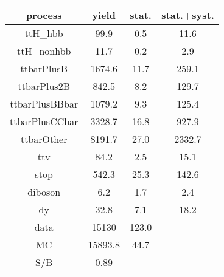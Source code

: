 \begin{tabular}{cccc}
\hline
    process     &  yield  &  stat.  &  stat.+syst.  \\
\hline
    ttH\_hbb     &  99.9   &   0.5   &     11.6      \\
   ttH\_nonhbb   &  11.7   &   0.2   &      2.9      \\
   ttbarPlusB   & 1674.6  &  11.7   &     259.1     \\
  ttbarPlus2B   &  842.5  &   8.2   &     129.7     \\
 ttbarPlusBBbar & 1079.2  &   9.3   &     125.4     \\
 ttbarPlusCCbar & 3328.7  &  16.8   &     927.9     \\
   ttbarOther   & 8191.7  &  27.0   &    2332.7     \\
      ttv       &  84.2   &   2.5   &     15.1      \\
      stop      &  542.3  &  25.3   &     142.6     \\
    diboson     &   6.2   &   1.7   &      2.4      \\
       dy       &  32.8   &   7.1   &     18.2      \\
      data      &  15130  &  123.0  &               \\
       MC       & 15893.8 &  44.7   &               \\
      S/B       &  0.89   &         &               \\
\hline
\end{tabular}
